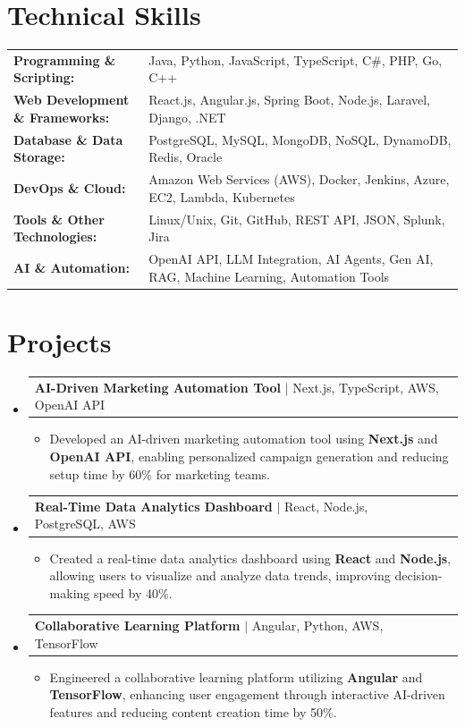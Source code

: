\documentclass[letterpaper,10pt]{article}
\makeatletter
\newcommand{\resumeItem}[1]{
  \item{\fontsize{8pt}{9pt}\selectfont
    #1 \vspace{-3pt}
  }
}
\newcommand{\resumeProjectHeading}[2]{
    \item
    \begin{tabular*}{1.001\textwidth}{l@{\extracolsep{\fill}}r}
      \fontsize{8.5pt}{10pt}#1 & \textbf{\fontsize{8.5pt}{10pt} #2}\\
    \end{tabular*}\vspace{-7pt}
}
\newcommand{\resumeSubHeadingListStart}{\begin{itemize}[leftmargin=0pt, label={}]}
\newcommand{\resumeSubHeadingListEnd}{\end{itemize}}
\newcommand{\resumeItemListStart}{\begin{itemize}[leftmargin=*]}
\newcommand{\resumeItemListEnd}{\end{itemize}\vspace{-5pt}}
\makeatother
\begin{document}
\section{Technical Skills}
        \vspace{-14pt}
        \begin{table}[h]
            \fontsize{8pt}{9pt}\selectfont
            \begin{tabular}{p{0.3\linewidth} p{0.7\linewidth}}
                \textbf{Programming \& Scripting:} & Java, Python, JavaScript, TypeScript, C\#, PHP, Go, C++ \\
                \textbf{Web Development \& Frameworks:} & React.js, Angular.js, Spring Boot, Node.js, Laravel, Django, .NET \\
                \textbf{Database \& Data Storage:} & PostgreSQL, MySQL, MongoDB, NoSQL, DynamoDB, Redis, Oracle \\
                \textbf{DevOps \& Cloud:} & Amazon Web Services (AWS), Docker, Jenkins, Azure, EC2, Lambda, Kubernetes \\
                \textbf{Tools \& Other Technologies:} & Linux/Unix, Git, GitHub, REST API, JSON, Splunk, Jira \\
                \textbf{AI \& Automation:} & OpenAI API, LLM Integration, AI Agents, Gen AI, RAG, Machine Learning, Automation Tools \\
            \end{tabular}
        \end{table}
 \vspace{-18pt}

\section{Projects}
    \vspace{-5pt}
    \resumeSubHeadingListStart
          \resumeProjectHeading
            {\textbf{AI-Driven Marketing Automation Tool} $|$ Next.js, TypeScript, AWS, OpenAI API}{}
            \resumeItemListStart
                \resumeItem{Developed an AI-driven marketing automation tool using \textbf{Next.js} and \textbf{OpenAI API}, enabling personalized campaign generation and reducing setup time by 60\% for marketing teams.}
            \resumeItemListEnd
        \vspace{-12pt}
    
        \resumeProjectHeading
            {\textbf{Real-Time Data Analytics Dashboard} $|$ React, Node.js, PostgreSQL, AWS}{}
        \resumeItemListStart
                \resumeItem{Created a real-time data analytics dashboard using \textbf{React} and \textbf{Node.js}, allowing users to visualize and analyze data trends, improving decision-making speed by 40\%.}
        \resumeItemListEnd
      \vspace{-12pt}
      \resumeProjectHeading
        {\textbf{Collaborative Learning Platform} $|$ Angular, Python, AWS, TensorFlow}{}
    \resumeItemListStart
            \resumeItem{Engineered a collaborative learning platform utilizing \textbf{Angular} and \textbf{TensorFlow}, enhancing user engagement through interactive AI-driven features and reducing content creation time by 50\%.}
    \resumeItemListEnd
    \resumeSubHeadingListEnd
\end{document}
